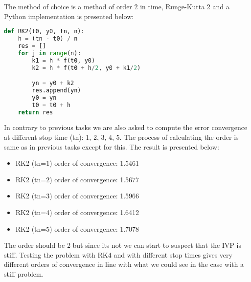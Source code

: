 \documentclass[a4paper]{article}
\begin{document}
The method of choice is a method of order 2 in time, Runge-Kutta 2 and a Python implementation is presented below: 
\begin{lstlisting}[language=Python]
def RK2(t0, y0, tn, n):
    h = (tn - t0) / n
    res = []
    for j in range(n):
        k1 = h * f(t0, y0)
        k2 = h * f(t0 + h/2, y0 + k1/2)

        yn = y0 + k2
        res.append(yn)
        y0 = yn
        t0 = t0 + h
    return res
\end{lstlisting}

In contrary to previous tasks we are also asked to compute the error convergence at different stop time (tn): 1, 2, 3, 4, 5. The process of calculating the order is same as in previous tasks except for this. The result is presented below: 

\begin{itemize}
	\item RK2 (tn=1) order of convergence:  1.5461
	\item RK2 (tn=2) order of convergence: 1.5677
	\item RK2 (tn=3) order of convergence:  1.5966
	\item RK2 (tn=4) order of convergence:  1.6412
	\item RK2 (tn=5) order of convergence:  1.7078
\end{itemize}

The order should be 2 but since its not we can start to suspect that the IVP is stiff. Testing the problem with RK4 and with different stop times gives very different orders of convergence in line with what we could see in the case with a stiff problem. 



\end{document}
